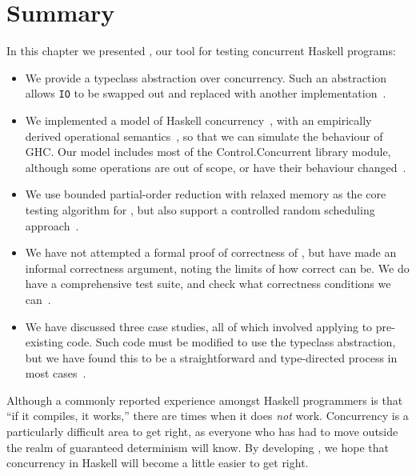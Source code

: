 \vfill\pagebreak
\section{Summary}

In this chapter we presented \dejafu{}, our tool for testing
concurrent Haskell programs:

\begin{itemize}
\item We provide a typeclass abstraction over concurrency.  Such an
  abstraction allows \verb|IO| to be swapped out and replaced with
  another implementation~.

\item We implemented a model of Haskell
  concurrency~, with an empirically derived
  operational semantics~, so that we can
  simulate the behaviour of GHC.  Our model includes most of the
  Control.Concurrent library module, although some operations are out
  of scope, or have their behaviour changed~.

\item We use bounded partial-order reduction\cite{coons2013} with
  relaxed memory\cite{zhang2015} as the core testing algorithm for
  \dejafu{}, but also support a controlled random scheduling
  approach~.

\item We have not attempted a formal proof of correctness of
  \dejafu{}, but have made an informal correctness argument, noting
  the limits of how correct \dejafu{} can be.  We do have a
  comprehensive test suite, and check what correctness conditions we
  can~.

\item We have discussed three case studies, all of which involved
  applying \dejafu{} to pre-existing code.  Such code must be modified
  to use the \dejafu{} typeclass abstraction, but we have found this
  to be a straightforward and type-directed process in most
  cases~.
\end{itemize}

Although a commonly reported experience amongst Haskell programmers is
that ``if it compiles, it works,'' there are times when it does
\emph{not} work.  Concurrency is a particularly difficult area to get
right, as everyone who has had to move outside the realm of guaranteed
determinism will know.  By developing \dejafu{}, we hope that
concurrency in Haskell will become a little easier to get right.

